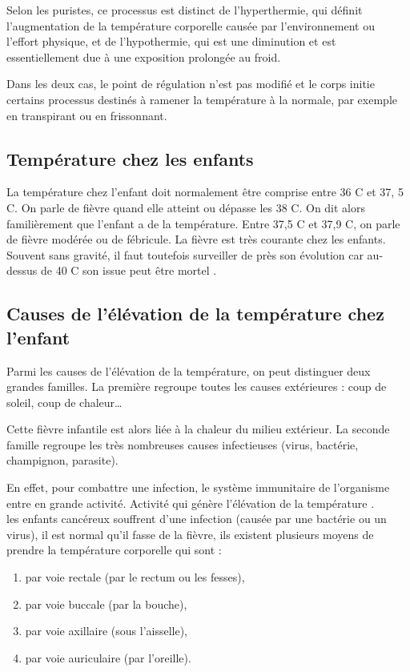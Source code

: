 \documentclass[12pt]{article}
\begin{document}
Selon les puristes, ce processus est distinct de l'hyperthermie, qui définit l'augmentation de la température corporelle causée par l'environnement ou l'effort physique, et de l'hypothermie, qui est une diminution et est essentiellement due à une exposition prolongée au froid. 

Dans les deux cas, le point de régulation n'est pas modifié et le corps initie certains processus destinés à ramener la température à la normale, par exemple en transpirant ou en frissonnant.

\subsection{Température chez les enfants}
La température chez l’enfant doit normalement être comprise entre 36 C\textdegree{} et 37, 5 C\textdegree{}. On parle de fièvre quand elle atteint ou dépasse les 38 C\textdegree{}. On dit alors familièrement que l’enfant a de la température. Entre 37,5 C\textdegree{} et 37,9 C\textdegree{}, on parle de fièvre modérée ou de fébricule. La fièvre est très courante chez les enfants. Souvent sans gravité, il faut toutefois surveiller de près son évolution car au-dessus de 40 C\textdegree{} son issue peut être mortel \cite{29}.

\subsection{Causes de l'élévation de la température chez l’enfant}
Parmi les causes de l'élévation de la température, on peut distinguer deux grandes familles. La première regroupe toutes les causes extérieures : coup de soleil, coup de chaleur… 

Cette fièvre infantile est alors liée à la chaleur du milieu extérieur. La seconde famille regroupe les très nombreuses causes infectieuses (virus, bactérie, champignon, parasite).

En effet, pour combattre une infection, le système immunitaire de l’organisme entre en grande activité. Activité qui génère l’élévation de la température \cite{30}.\\

les enfants cancéreux souffrent d’une infection (causée par une bactérie ou un virus), il est normal qu’il fasse de la fièvre, ils existent plusieurs moyens de prendre la température corporelle qui sont :
\begin{enumerate}
	\item par voie rectale (par le rectum ou les fesses),
	\item par voie buccale (par la bouche),
	\item par voie axillaire (sous l’aisselle),
	\item par voie auriculaire (par l’oreille).
\end{enumerate}
\end{document}
